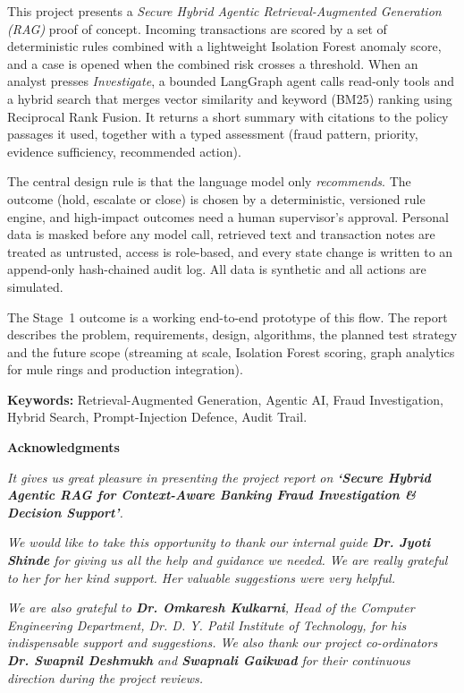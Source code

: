 \documentclass[oneside,a4paper,12pt]{report}
\newcommand{\projtitle}{Secure Hybrid Agentic RAG for Context-Aware Banking Fraud Investigation \& Decision Support}
\begin{document}
This project presents a \emph{Secure Hybrid Agentic Retrieval-Augmented Generation (RAG)} proof of concept. Incoming transactions are scored by a set of deterministic rules combined with a lightweight Isolation Forest anomaly score, and a case is opened when the combined risk crosses a threshold. When an analyst presses \emph{Investigate}, a bounded LangGraph agent calls read-only tools and a hybrid search that merges vector similarity and keyword (BM25) ranking using Reciprocal Rank Fusion. It returns a short summary with citations to the policy passages it used, together with a typed assessment (fraud pattern, priority, evidence sufficiency, recommended action).

The central design rule is that the language model only \emph{recommends}. The outcome (hold, escalate or close) is chosen by a deterministic, versioned rule engine, and high-impact outcomes need a human supervisor's approval. Personal data is masked before any model call, retrieved text and transaction notes are treated as untrusted, access is role-based, and every state change is written to an append-only hash-chained audit log. All data is synthetic and all actions are simulated.

The Stage~1 outcome is a working end-to-end prototype of this flow. The report describes the problem, requirements, design, algorithms, the planned test strategy and the future scope (streaming at scale, Isolation Forest scoring, graph analytics for mule rings and production integration).

\vspace{1em}
\noindent\textbf{Keywords:} Retrieval-Augmented Generation, Agentic AI, Fraud Investigation, Hybrid Search, Prompt-Injection Defence, Audit Trail.

\newpage
\begin{center}{\bfseries \fontsize{14}{16}\selectfont Acknowledgments}\end{center}
\vspace{1em}
\setlength{\parindent}{0mm}
\textit{It gives us great pleasure in presenting the project report on \textbf{`\projtitle'}.}

\vspace{1em}
\textit{We would like to take this opportunity to thank our internal guide \textbf{Dr. Jyoti Shinde} for giving us all the help and guidance we needed. We are really grateful to her for her kind support. Her valuable suggestions were very helpful.}

\vspace{1em}
\textit{We are also grateful to \textbf{Dr. Omkaresh Kulkarni}, Head of the Computer Engineering Department, Dr. D. Y. Patil Institute of Technology, for his indispensable support and suggestions. We also thank our project co-ordinators \textbf{Dr. Swapnil Deshmukh} and \textbf{Swapnali Gaikwad} for their continuous direction during the project reviews.}
\end{document}
